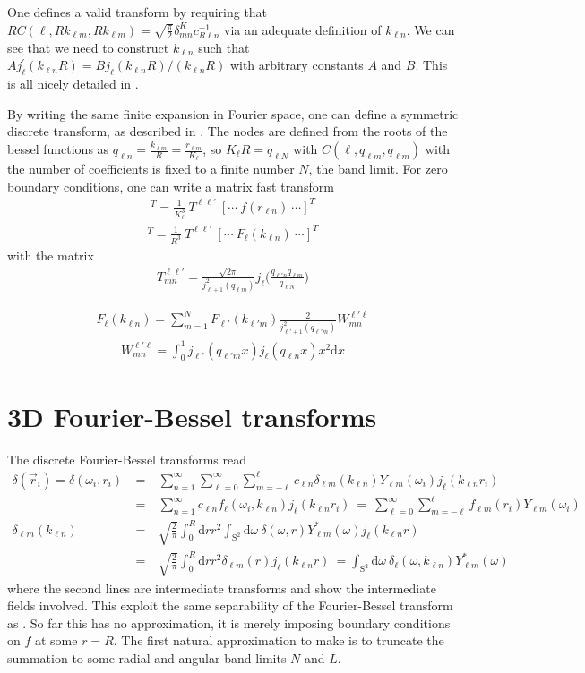 \documentclass{aastex6}
\renewcommand{\d}{{\mathrm{d}}}
\newcommand{\eqn}[1]{\begin{eqnarray}#1\end{eqnarray}}
\begin{document}
One defines a valid transform by requiring that $  R  C(\ell, Rk_{\ell m}, Rk_{\ell m})= \sqrt{\frac{\pi}{2}} \delta^K_{m n} c^{-1}_{R\ell n}$ via an adequate definition of $k_{\ell n}$. We can see that we need to construct  $k_{\ell n}$ such that $A j^\prime_\ell( k_{\ell n} R) = B j_\ell( k_{\ell n} R)  / ( k_{\ell n} R)$ with arbitrary constants $A$ and $B$.  
This is all nicely detailed in \cite{Fisher1994}.

By writing the same finite expansion in Fourier space, one can define a symmetric discrete transform, as described in \cite{Lanusse2012}. 
The nodes are defined from the roots of the bessel functions as $q_{\ell n}  = \frac{k_{\ell m}}{R} = \frac{r_{\ell m}}{K_\ell}$, so $K_\ell R = q_{\ell N}$ with
$C(\ell, q_{\ell m}, q_{\ell m})$ with the number of coefficients is fixed to a finite number $N$, the band limit. 
For zero boundary conditions, one can write a matrix fast transform
\eqn{
	[ \cdots \ F_\ell(k_{\ell' m}) \ \cdots]^T = \frac{1}{K_\ell^3} \ T^{\ell \ell'} \  [ \cdots \ f(r_{\ell n}) \ \cdots]^T
}
\eqn{
	[ \cdots \ f(r_{\ell' m}) \ \cdots]^T = \frac{1}{R^3} \ T^{\ell \ell'} \  [ \cdots \ F_\ell(k_{\ell n}) \ \cdots]^T
}
with the matrix
\eqn{
	 T^{\ell \ell'}_{mn} = \frac{\sqrt{2\pi}}{j^2_{\ell+1}(q_{\ell m})} j_\ell \bigl(\frac{q_{\ell' n}q_{\ell m}}{q_{\ell N}} \bigr)
}

\eqn{
	F_\ell(k_{\ell n}) = \sum_{m=1}^N F_{\ell'}(k_{\ell' m}) \frac{2}{j^2_{\ell'+1}(q_{\ell'm})} W^{\ell ' \ell}_{mn}
}
\eqn{
	W^{\ell ' \ell}_{mn} = \int_0^1 j_{\ell '}(q_{\ell ' m}x) j_\ell(q_{\ell n}x) x^2 \d x
}


\section{3D Fourier-Bessel transforms}

The discrete Fourier-Bessel transforms read
\eqn{
	\delta(\vec{r}_i) = \delta(\omega_i, r_i) \ &=& \ \sum_{n=1}^\infty  \sum_{\ell = 0}^\infty \sum_{m = -\ell}^\ell  c_{\ell n}    \delta_{\ell m}(k_{\ell n})Y_{\ell m}(\omega_i) j_\ell(k_{\ell n}r_i) \\
	&=& \ \sum_{n=1}^\infty  c_{\ell n} f_\ell(\omega_i, k_{\ell n})  j_\ell(k_{\ell n}r_i) \ = \ \sum_{\ell = 0}^\infty \sum_{m = -\ell}^\ell  f_{\ell m}(r_i) Y_{\ell m}(\omega_i) \\
	\delta_{\ell m}(k_{\ell n}) \ &=&\ \sqrt{\frac{2}{\pi}} \int_0^R \d r r^2 \int_{\mathrm{S}^2} \d \omega \ \delta(\omega, r) Y_{\ell m}^*(\omega) j_\ell(k_{\ell n}r)\\
	&=&\ \sqrt{\frac{2}{\pi}} \int_0^R \d r r^2  \delta_{\ell m}(r)  j_\ell(k_{\ell n}r) \ = \int_{\mathrm{S}^2} \d \omega \ \delta_\ell(\omega, k_{\ell n}) Y_{\ell m}^*(\omega) 
}
where the second lines are intermediate transforms and show the intermediate fields involved. 
This exploit the same separability of the Fourier-Bessel transform as \cite{Leistedt2012}.
So far this has no approximation, it is merely imposing boundary conditions on $f$ at some $r=R$. The first natural approximation to make is to truncate the summation to some radial and angular band limits $N$ and $L$.
\end{document}
